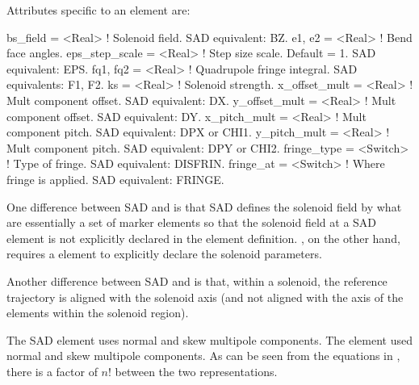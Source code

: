 {
Attributes specific to an  element are:
\begin{example}
  bs_field        = <Real>    ! Solenoid field. SAD equivalent: BZ.
  e1, e2          = <Real>    ! Bend face angles.
  eps_step_scale  = <Real>    ! Step size scale. Default = 1. SAD equivalent: EPS.
  fq1, fq2        = <Real>    ! Quadrupole fringe integral. SAD equivalents: F1, F2.
  ks              = <Real>    ! Solenoid strength. 
  x_offset_mult   = <Real>    ! Mult component offset. SAD equivalent: DX.
  y_offset_mult   = <Real>    ! Mult component offset. SAD equivalent: DY.
  x_pitch_mult    = <Real>    ! Mult component pitch. SAD equivalent: DPX or CHI1.
  y_pitch_mult    = <Real>    ! Mult component pitch. SAD equivalent: DPY or CHI2.
  fringe_type     = <Switch>  ! Type of fringe. SAD equivalent: DISFRIN.
  fringe_at       = <Switch>  ! Where fringe is applied. SAD equivalent: FRINGE.
\end{example}


One difference between SAD and \bmad is that SAD defines the solenoid
field by what are essentially a set of marker elements so that the
solenoid field at a SAD  element is not explicitly declared
in the  element definition. \bmad, on the other hand,
requires a  element to explicitly declare the solenoid
parameters.

Another difference between SAD and \bmad is that, within a solenoid,
the reference trajectory is aligned with the solenoid axis (and not
aligned with the axis of the elements within the solenoid region).

The SAD  element uses normal  and skew 
multipole components. The \bmad {} element used normal
 and skew  multipole components. As can be seen from the
equations in , there is a factor of $n!$ between the
two representations.

}
